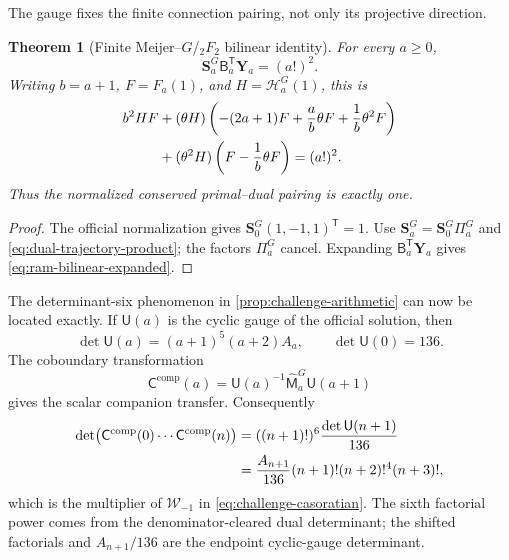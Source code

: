 \documentclass[11pt]{article}
\newtheorem{theorem}{Theorem}[section]
\theoremstyle{definition}
\theoremstyle{remark}
\begin{document}
The gauge fixes the finite connection pairing, not only its projective
direction.

\begin{theorem}[Finite Meijer--\(G\)/\({}_2F_2\) bilinear identity]
\label{thm:ram-bilinear}
For every \(a\ge0\),
\begin{equation}\label{eq:ram-bilinear-matrix}
 \boxed{\displaystyle
 \mathbf S_a^G\mathsf B_a^{\mathsf T}\mathbf Y_a=(a!)^2.}
\end{equation}
Writing \(b=a+1\), \(F=F_a(1)\), and
\(H=\mathcal H_a^G(1)\), this is
\begin{align}
 b^2HF
 &+(\theta H)\left(-(2a+1)F+\frac ab\theta F
                         +\frac1b\theta^2F\right)\notag\\
 &+(\theta^2H)\left(F-\frac1b\theta F\right)=(a!)^2.
 \label{eq:ram-bilinear-expanded}
\end{align}
Thus the normalized conserved primal--dual pairing is exactly one.
\end{theorem}

\begin{proof}
The official normalization gives
\(\mathbf S_0^G(1,-1,1)^{\mathsf T}=1\).  Use
\(\mathbf S_a^G=\mathbf S_0^G\Pi_a^G\) and
\eqref{eq:dual-trajectory-product}; the factors \(\Pi_a^G\) cancel.
Expanding \(\mathsf B_a^{\mathsf T}\mathbf Y_a\) gives
\eqref{eq:ram-bilinear-expanded}.
\end{proof}

The determinant-six phenomenon in \cref{prop:challenge-arithmetic} can now
be located exactly.  If \(\mathsf U(a)\) is the cyclic gauge of the official
solution, then
\begin{equation}\label{eq:cyclic-gauge-det}
 \det\mathsf U(a)=(a+1)^5(a+2)A_a,\qquad \det\mathsf U(0)=136.
\end{equation}
The coboundary transformation
\begin{equation}\label{eq:companion-gauge-definition}
 \mathsf C^{\mathrm{comp}}(a)=
 \mathsf U(a)^{-1}\widehat{\mathsf M}_a^G\mathsf U(a+1)
\end{equation}
gives the scalar companion transfer.  Consequently
\begin{align}
 \det\bigl(\mathsf C^{\mathrm{comp}}(0)\cdots
                 \mathsf C^{\mathrm{comp}}(n)\bigr)
 &=((n+1)!)^6\frac{\det\mathsf U(n+1)}{136}\notag\\
 &=\frac{A_{n+1}}{136}(n+1)!(n+2)!^4(n+3)!,
 \label{eq:casoratian-gauge-origin}
\end{align}
which is the multiplier of \(\mathcal W_{-1}\) in
\eqref{eq:challenge-casoratian}.  The sixth factorial power comes from the
denominator-cleared dual determinant; the shifted factorials and
\(A_{n+1}/136\) are the endpoint cyclic-gauge determinant.
\end{document}
